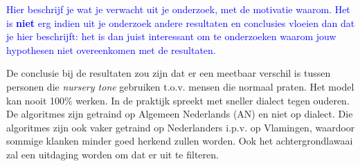 \textcolor{blue}{Hier beschrijf je wat je verwacht uit je onderzoek, met de motivatie waarom. Het is \textbf{niet} erg indien uit je onderzoek andere resultaten en conclusies vloeien dan dat je hier beschrijft: het is dan juist interessant om te onderzoeken waarom jouw hypothesen niet overeenkomen met de resultaten.}

De conclusie bij de resultaten zou zijn dat er een meetbaar verschil is tussen personen die \textit{nursery tone} gebruiken t.o.v. mensen die normaal praten. Het model kan nooit 100\% werken. In de praktijk spreekt met sneller dialect tegen ouderen. De algoritmes zijn getraind op Algemeen Nederlands (AN) en niet op dialect. Die algoritmes zijn ook vaker getraind op Nederlanders i.p.v. op Vlamingen, waardoor sommige klanken minder goed herkend zullen worden. Ook het achtergrondlawaai zal een uitdaging worden om dat er uit te filteren.
